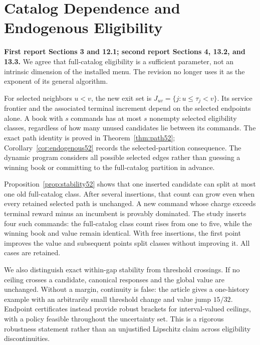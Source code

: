 \section{Catalog Dependence and Endogenous Eligibility}
\textbf{First report Sections 3 and 12.1; second report Sections 4, 13.2, and 13.3.}
We agree that full-catalog eligibility is a sufficient parameter, not an intrinsic dimension of the installed menu. The revision no longer uses it as the exponent of its general algorithm.

For selected neighbors $u<v$, the new exit set is $J_{uv}=\{j:u\leq\tau_j<v\}$. Its service frontier and the associated terminal increment depend on the selected endpoints alone. A book with $s$ commands has at most $s$ nonempty selected eligibility classes, regardless of how many unused candidates lie between its commands. The exact path identity is proved in Theorem~\ref{thm:path52}; Corollary~\ref{cor:endogenous52} records the selected-partition consequence. The dynamic program considers all possible selected edges rather than guessing a winning book or committing to the full-catalog partition in advance.

Proposition~\ref{prop:stability52} shows that one inserted candidate can split at most one old full-catalog class. After several insertions, that count can grow even when every retained selected path is unchanged. A new command whose charge exceeds terminal reward minus an incumbent is provably dominated. The study inserts four such commands: the full-catalog class count rises from one to five, while the winning book and value remain identical. With free insertions, the first point improves the value and subsequent points split classes without improving it. All cases are retained.

We also distinguish exact within-gap stability from threshold crossings. If no ceiling crosses a candidate, canonical responses and the global value are unchanged. Without a margin, continuity is false: the article gives a one-history example with an arbitrarily small threshold change and value jump $15/32$. Endpoint certificates instead provide robust brackets for interval-valued ceilings, with a policy feasible throughout the uncertainty set. This is a rigorous robustness statement rather than an unjustified Lipschitz claim across eligibility discontinuities.


